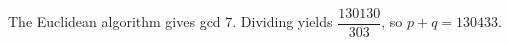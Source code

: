 The Euclidean algorithm gives gcd $7$. Dividing yields $\dfrac{130130}{303}$, so $\boxed{p+q=130433}$.

